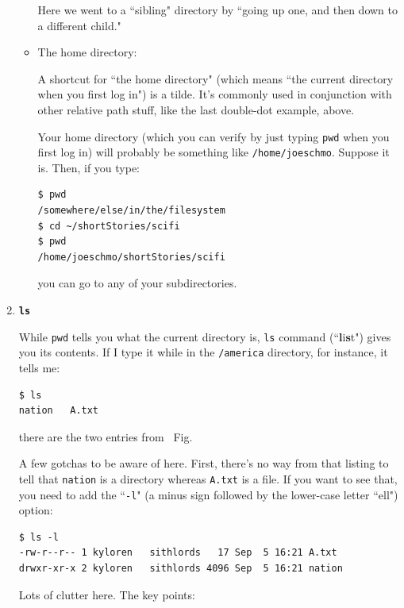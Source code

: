 \begin{enumerate}
\begin{itemize}
Here we went to a ``sibling" directory by ``going up one, and then down to a
different child."

\item The home directory: \texttt{\textbf{\freakingtilde}}

A shortcut for ``the home directory" (which means ``the current directory when
you first log in") is a tilde. It's commonly used in conjunction with other
relative path stuff, like the last double-dot example, above.

Your home directory (which you can verify by just typing \texttt{pwd} when
you first log in) will probably be something like \texttt{/home/joeschmo}.
Suppose it is. Then, if you type:

\begin{verbatim}
$ pwd
/somewhere/else/in/the/filesystem
$ cd ~/shortStories/scifi
$ pwd
/home/joeschmo/shortStories/scifi
\end{verbatim}

you can go to any of your subdirectories.

\end{itemize}

\bigline
\item \textbf{\texttt{ls}}

While \texttt{pwd} tells you what the current directory is, \texttt{ls}
command (``\textbf{l}i\textbf{s}t") gives you its contents. If I type it while
in the \texttt{/america} directory, for instance, it tells me:

\begin{verbatim}
$ ls
nation   A.txt
\end{verbatim}

there are the two entries from ~Fig.

A few gotchas to be aware of here. First, there's no way from that listing to
tell that \texttt{nation} is a directory whereas \texttt{A.txt} is a file. If
you want to see that, you need to add the ``\texttt{-l}" (a minus sign
followed by the lower-case letter ``ell") option:

\begin{verbatim}
$ ls -l
-rw-r--r-- 1 kyloren   sithlords   17 Sep  5 16:21 A.txt
drwxr-xr-x 2 kyloren   sithlords 4096 Sep  5 16:21 nation
\end{verbatim}

Lots of clutter here. The key points:



\end{enumerate}
